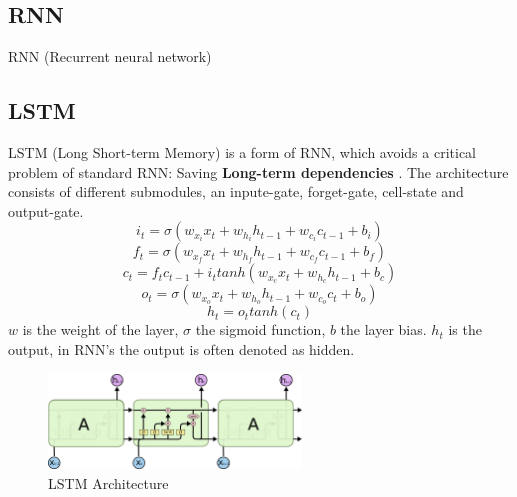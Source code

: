  \subsection{RNN} \label{subsection::rnn}
  RNN (Recurrent neural network)
 
 \subsection{LSTM} \label{subsection::lstm}
  LSTM (Long Short-term Memory) \cite{Hochreiter1997} is a form of RNN, which avoids a critical problem of standard RNN: Saving \textbf{Long-term dependencies} \cite{Goodfellow2016}.
  The architecture consists of different submodules, an inpute-gate, forget-gate, cell-state and output-gate.
  \begin{equation}
   i_t = \sigma(w_{x_i}x_t + w_{h_i}h_{t-1} + w_{c_i}c_{t-1} + b_i)
  \end{equation}
  \begin{equation}
   f_t = \sigma(w_{x_f}x_t + w_{h_f}h_{t-1} + w_{c_f}c_{t-1} + b_f)
  \end{equation}
  \begin{equation}
   c_t = f_tc_{t-1} + i_ttanh(w_{x_c}x_t + w_{h_c}h_{t-1} + b_c)
  \end{equation}
  \begin{equation}
   o_t = \sigma(w_{x_o}x_t + w_{h_o}h_{t-1} + w_{c_o}c_t + b_o)
  \end{equation}
  \begin{equation}
   h_t = o_ttanh(c_t)
  \end{equation}
  $w$ is the weight of the layer, $\sigma$ the sigmoid function, $b$ the layer bias. $h_t$ is the output, in RNN's
  the output is often denoted as hidden.
  \begin{figure}[H]
   \includegraphics[width=0.6\textwidth]{../Images/lstm_chain.png}
   \centering
   \caption{LSTM Architecture \citep{Olah2015}}
   \label{fig:lstm_architecture}
  \end{figure}
 
